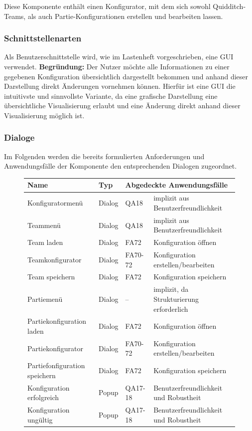Diese Komponente enthält einen Konfigurator, mit dem sich sowohl Quidditch-Teams, als auch Partie-Konfigurationen erstellen und bearbeiten lassen.

\subsubsection{Schnittstellenarten}
Als Benutzerschnittstelle wird, wie im Lastenheft vorgeschrieben, eine GUI verwendet. \textbf{Begründung:} Der Nutzer möchte alle Informationen zu einer gegebenen Konfiguration übersichtlich dargestellt bekommen und anhand dieser Darstellung direkt Änderungen vornehmen können. Hierfür ist eine GUI die intuitivste und sinnvollste Variante, da eine grafische Darstellung eine übersichtliche Visualisierung erlaubt und eine Änderung direkt anhand dieser Visualisierung möglich ist. 

\subsubsection{Dialoge}
Im Folgenden werden die bereits formulierten Anforderungen und Anwendungsfälle der Komponente den entsprechenden Dialogen zugeordnet.

\begin{figure}[H]
    \centering
    \begin{tabular}{| l l l l |}
    \hline
    \textbf{Name} & \textbf{Typ} & \multicolumn{2}{l|}{\textbf{Abgedeckte Anwendungsfälle}} \\\hline
    Konfiguratormenü & Dialog & QA18 & implizit aus Benutzerfreundlichkeit\\\hline
    Teammenü & Dialog & QA18 & implizit aus Benutzerfreundlichkeit\\\hline
    Team laden & Dialog & FA72 & Konfiguration öffnen \\\hline
    Teamkonfigurator & Dialog & FA70-72 & Konfiguration erstellen/bearbeiten\\\hline
    Team speichern & Dialog & FA72 & Konfiguration speichern \\\hline
    Partiemenü & Dialog & – & implizit, da Strukturierung erforderlich\\\hline
    Partiekonfiguration laden & Dialog & FA72 & Konfiguration öffnen \\\hline
    Partiekonfigurator & Dialog & FA70-72 & Konfiguration erstellen/bearbeiten\\\hline
    Partiefonfiguration speichern & Dialog & FA72 & Konfiguration speichern \\\hline
    Konfiguration erfolgreich & Popup & QA17-18 & Benutzerfreundlichkeit und Robustheit\\\hline
    Konfiguration ungültig & Popup & QA17-18 & Benutzerfreundlichkeit und Robustheit\\\hline
    \end{tabular}
\end{figure}

